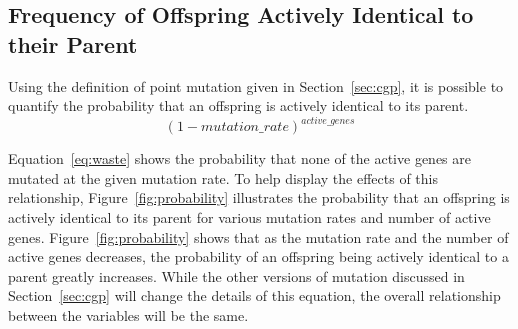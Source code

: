 \documentclass[runningheads,a4paper]{llncs}
\begin{document}
\subsection{Frequency of Offspring Actively Identical to their Parent}
\label{sec:freq}
Using the definition of point mutation given in Section~\ref{sec:cgp},
it is possible to quantify the probability that an offspring is actively
identical to its parent.
\begin{equation}
  \left (1 - mutation\_rate  \right )^{active\_genes}
\label{eq:waste}
\end{equation}
\begin{comment}
First, the number of active genes in each individual
is given by Equation~\ref{eq:active}.  This shows how the number of active genes
can change greatly with the number of active nodes and the arity used for each node.
\begin{equation}
  active\_genes = active\_nodes\cdot\left(arity + 1 \right) + output\_length
  \label{eq:active}
\end{equation}
\end{comment}
Equation~\ref{eq:waste} shows the probability that none of the active genes are
mutated at the given mutation rate.  To help display the effects of this relationship,
Figure~\ref{fig:probability} illustrates the probability that an offspring is actively
identical to its parent for various mutation rates and number of active genes.
Figure~\ref{fig:probability} shows that as the mutation rate and the number of active genes decreases,
the probability of an offspring being actively identical to a parent greatly increases.
While the other versions of mutation discussed in Section~\ref{sec:cgp} will change the details
of this equation, the overall relationship between the variables will be the same.

\begin{comment}
Using the other versions of mutation in Section~\ref{sec:cgp} does not change the
overall relationship of the number of active genes and the mutation rate to the
frequency of wasted evaluations.  If mutated genes are not forced to change to a
new value the probability of actively identical offspring will increase.  While this is intuitively
straightforward, determining the exact amount of increase is complex as the probability
that a randomly reset gene returns to its current value depends on which gene is being mutated.
If mutation is changed to have a set percentage of the genome mutated, the relationship
changes to use the percentage of the genome that is active, but it will still follow the general
shape of Figure~\ref{fig:probability}.
\end{comment}
\end{document}
